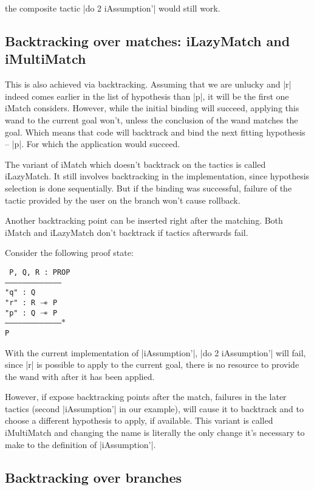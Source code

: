 the composite tactic \coqe|do 2 iAssumption'| would still work.

\subsection{Backtracking over matches: iLazyMatch and iMultiMatch}

This is also achieved via backtracking.
Assuming that we are unlucky and \coqe|r| indeed comes earlier in the list of hypothesis than \coqe|p|, it will be the first one iMatch considers.
However, while the initial binding will succeed, applying this wand to the current goal won't, unless the conclusion of the wand matches the goal.
Which means that code will backtrack and bind the next fitting hypothesis -- \coqe|p|.
For which the application would succeed.

The variant of iMatch which doesn't backtrack on the tactics is called iLazyMatch.
It still involves backtracking in the implementation, since hypothesis selection is done sequentially.
But if the binding was successful, failure of the tactic provided by the user on the branch won't cause rollback.

Another backtracking point can be inserted right after the matching.
Both iMatch and iLazyMatch don't backtrack if tactics afterwards fail.

Consider the following proof state:

\texttt{
P, Q, R : PROP\\
---------------------------------------\\
"q" : Q\\
"r" : R $\mathrel{-\mkern-6mu*}$ P\\
"p" : Q $\mathrel{-\mkern-6mu*}$ P\\
--------------------------------------$\ast$\\
P
}

With the current implementation of \coqe|iAssumption'|, \coqe|do 2 iAssumption'| will fail, since \coqe|r| is possible to apply to the current goal, there is no resource to provide the wand with after it has been applied.

However, if expose backtracking points after the match, failures in the later tactics (second \coqe|iAssumption'| in our example), will cause it to backtrack and
to choose a different hypothesis to apply, if available.
This variant is called iMultiMatch and changing the name is literally the only change it's necessary to make to the definition of \coqe|iAssumption'|.

\subsection{Backtracking over branches}

